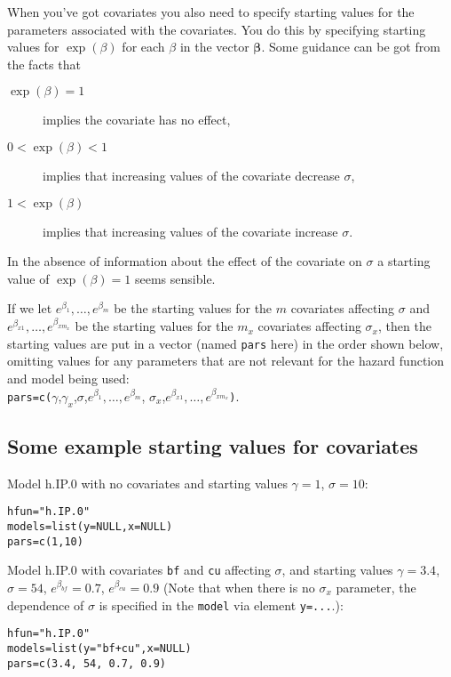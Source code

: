 \documentclass{article}
\begin{document}
When you've got covariates you also need to specify starting values for the parameters associated with the covariates. You do this by specifying starting values for $\exp(\beta)$ for each $\beta$ in the vector $\boldsymbol{\beta}$. Some guidance can be got from the facts that

\begin{description}
\item[$\exp(\beta)=1$] implies the covariate has no effect,
\item[$0<\exp(\beta)<1$] implies that increasing values of the covariate decrease $\sigma$,
\item[$1<\exp(\beta)$] implies that increasing values of the covariate increase $\sigma$.
\end{description}

In the absence of information about the effect of the covariate on $\sigma$ a starting value of $\exp(\beta)=1$ seems sensible. 

If we let $e^{\beta_{1}},\ldots,e^{\beta_{m}}$ be the starting values for the $m$ covariates affecting $\sigma$ and $e^{\beta_{x1}},\ldots,e^{\beta_{xm_x}}$ be the starting values for the $m_x$ covariates affecting $\sigma_x$, then the starting values are put in a vector (named \verb|pars| here) in the order shown below, omitting values for any parameters that are not relevant for the hazard function and model being used:\\
\verb|pars=c(|$\gamma$,$\gamma_x$,$\sigma$,$e^{\beta_{1}},\ldots,e^{\beta_{m}}$, $\sigma_x$,$e^{\beta_{x1}},\ldots,e^{\beta_{xm_x}}$\verb|)|. 



\subsection{Some example starting values for covariates}

Model h.IP.0 with no covariates and starting values $\gamma=1$, $\sigma=10$:
\begin{verbatim}
hfun="h.IP.0"
models=list(y=NULL,x=NULL)
pars=c(1,10)
\end{verbatim}

\noindent
Model h.IP.0 with covariates \verb|bf| and \verb|cu| affecting $\sigma$, and starting values $\gamma=3.4$, $\sigma=54$, $e^{\beta_{bf}}=0.7$, $e^{\beta_{cu}}=0.9$ (Note that when there is no $\sigma_x$ parameter, the dependence of $\sigma$ is specified in the \verb|model| via element \verb|y=...|.):
\begin{verbatim}
hfun="h.IP.0"
models=list(y="bf+cu",x=NULL)
pars=c(3.4, 54, 0.7, 0.9)
\end{verbatim}
\end{document}
